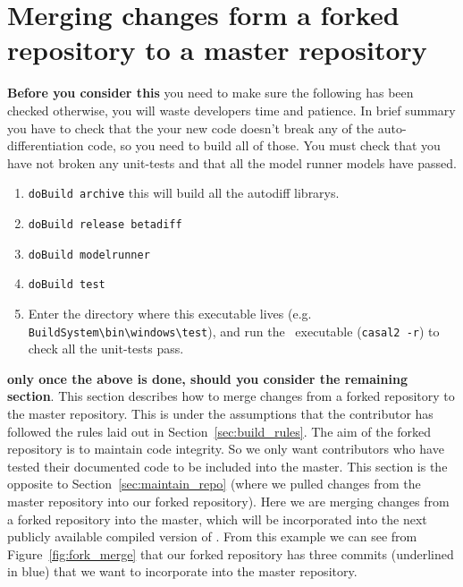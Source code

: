 \section{Merging changes form a forked repository to a master repository\label{sec:pull_requests}}

\textbf{Before you consider this} you need to make sure the following has been checked otherwise, you will waste developers time and patience. In brief summary you have to check that the your new code doesn't break any of the auto-differentiation code, so you need to build all of those. You must check that you have not broken any unit-tests and that all the model runner models have passed.

\begin{enumerate}
\item \texttt{doBuild archive} this will build all the autodiff librarys.
\item \texttt{doBuild release betadiff}
\item \texttt{doBuild modelrunner}
\item \texttt{doBuild test} 
\item Enter the directory where this executable lives (e.g. \texttt{BuildSystem\textbackslash bin\textbackslash windows\textbackslash test}), and run the \CNAME\ executable (\texttt{casal2 -r}) to check all the unit-tests pass.
			
\end{enumerate}


\textbf{only once the above is done, should you consider the remaining section}. This section describes how to merge changes from a forked repository to the master repository. This is under the assumptions that the contributor has followed the rules laid out in Section~\ref{sec:build_rules}. The aim of the forked repository is to maintain code integrity. So we only want contributors who have tested their documented code to be included into the master. This section is the opposite to Section~\ref{sec:maintain_repo} (where we pulled changes from the master repository into our forked repository). Here we are merging changes from a forked repository into the master, which will be incorporated into the next publicly available compiled version of \CNAME. From this example we can see from Figure~\ref{fig:fork_merge} that our forked repository has three commits (underlined in blue) that we want to incorporate into the master repository.

